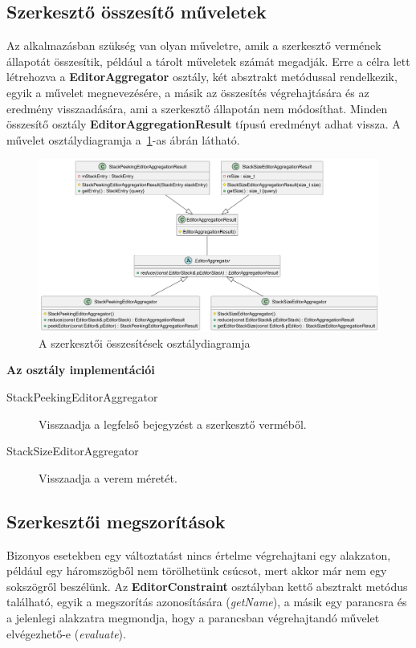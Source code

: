 \subsection{Szerkesztő összesítő műveletek}

Az alkalmazásban szükség van olyan műveletre, amik a szerkesztő vermének állapotát összesítik, például a tárolt műveletek számát megadják. Erre a célra lett létrehozva a \textbf{EditorAggregator} osztály, két absztrakt metódussal rendelkezik, egyik a művelet megnevezésére, a másik az összesítés végrehajtására és az eredmény visszaadására, ami a szerkesztő állapotán nem módosíthat. Minden összesítő osztály \textbf{EditorAggregationResult} típusú eredményt adhat vissza. A művelet osztálydiagramja a~\ref{fig:class_editor_aggregator-1}-as ábrán látható.

\begin{figure}[H]
	\centering
	\includegraphics[width=1\linewidth]{images/class_editor_aggregator.png}
	\caption{A szerkesztői összesítések osztálydiagramja}
	\label{fig:class_editor_aggregator-1}
\end{figure}

\textbf{Az osztály implementációi}

\begin{description}
	\item[StackPeekingEditorAggregator] Visszaadja a legfelső bejegyzést a szerkesztő verméből.
	\item[StackSizeEditorAggregator] Visszaadja a verem méretét.
\end{description}

\subsection{Szerkesztői megszorítások}

Bizonyos esetekben egy változtatást nincs értelme végrehajtani egy alakzaton, például egy háromszögből nem törölhetünk csúcsot, mert akkor már nem egy sokszögről beszélünk. Az \textbf{EditorConstraint} osztályban kettő absztrakt metódus található, egyik a megszorítás azonosítására (\textit{getName}), a másik egy parancsra és a jelenlegi alakzatra megmondja, hogy a parancsban végrehajtandó művelet elvégezhető-e (\textit{evaluate}).

